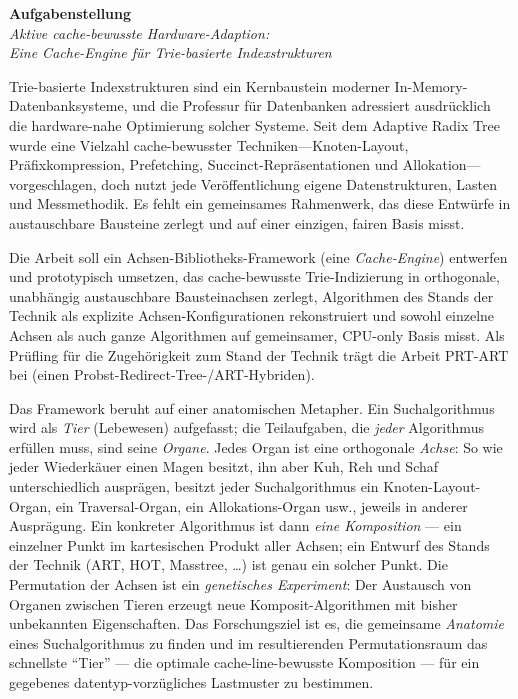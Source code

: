 {\large\textbf{Aufgabenstellung}}\\[0.4em]
{\itshape Aktive cache-bewusste Hardware-Adaption:\\ Eine Cache-Engine für Trie-basierte Indexstrukturen}

\bigskip
{}
Trie-basierte Indexstrukturen sind ein Kernbaustein moderner
In-Memory-Datenbanksysteme, und die Professur für Datenbanken adressiert
ausdrücklich die hardware-nahe Optimierung solcher Systeme. Seit dem Adaptive
Radix Tree wurde eine Vielzahl cache-bewusster Techniken---Knoten-Layout,
Präfixkompression, Prefetching, Succinct-Repräsentationen und Allokation---vorgeschlagen,
doch nutzt jede Veröffentlichung eigene Datenstrukturen, Lasten und
Messmethodik. Es fehlt ein gemeinsames Rahmenwerk, das diese Entwürfe in
austauschbare Bausteine zerlegt und auf einer einzigen, fairen Basis misst.

Die Arbeit soll ein Achsen-Bibliotheks-Framework (eine \emph{Cache-Engine})
entwerfen und prototypisch umsetzen, das cache-bewusste Trie-Indizierung in
orthogonale, unabhängig austauschbare Bausteinachsen zerlegt, Algorithmen des
Stands der Technik als explizite Achsen-Konfigurationen rekonstruiert und
sowohl einzelne Achsen als auch ganze Algorithmen auf gemeinsamer, CPU-only
Basis misst. Als Prüfling für die Zugehörigkeit zum Stand der Technik trägt die
Arbeit \mbox{PRT-ART} bei (einen Probst-Redirect-Tree-/ART-Hybriden).

Das Framework beruht auf einer anatomischen Metapher. Ein Suchalgorithmus wird
als \emph{Tier} (Lebewesen) aufgefasst; die Teilaufgaben, die \emph{jeder}
Algorithmus erfüllen muss, sind seine \emph{Organe}. Jedes Organ ist eine
orthogonale \emph{Achse}: So wie jeder Wiederkäuer einen Magen besitzt, ihn aber
Kuh, Reh und Schaf unterschiedlich ausprägen, besitzt jeder Suchalgorithmus ein
Knoten-Layout-Organ, ein Traversal-Organ, ein Allokations-Organ usw., jeweils in
anderer Ausprägung. Ein konkreter Algorithmus ist dann \emph{eine Komposition}
--- ein einzelner Punkt im kartesischen Produkt aller Achsen; ein Entwurf des
Stands der Technik (ART, HOT, Masstree, \ldots) ist genau ein solcher Punkt. Die
Permutation der Achsen ist ein \emph{genetisches Experiment}: Der Austausch von
Organen zwischen Tieren erzeugt neue Komposit-Algorithmen mit bisher unbekannten
Eigenschaften. Das Forschungsziel ist es, die gemeinsame \emph{Anatomie} eines
Suchalgorithmus zu finden und im resultierenden Permutationsraum das schnellste
``Tier'' --- die optimale cache-line-bewusste Komposition --- für ein gegebenes
datentyp-vorzügliches Lastmuster zu bestimmen.

